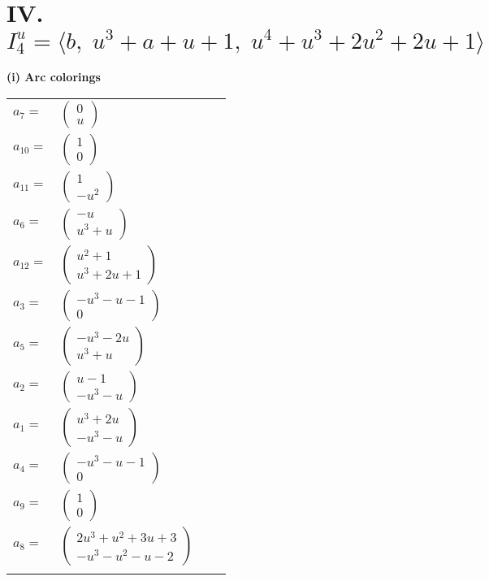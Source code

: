 \documentclass[1p]{elsarticle_modified}
\theoremstyle{definition}
\begin{document}
\centering \section*{IV. $I^u_{4}= \langle b,\;u^3+a+u+1,\;u^4+u^3+2 u^2+2 u+1 \rangle$}
\flushleft \textbf{(i) Arc colorings}\\
\begin{tabular}{m{7pt} m{180pt} m{7pt} m{180pt} }
\flushright $a_{7}=$&$\begin{pmatrix}0\\u\end{pmatrix}$ \\
\flushright $a_{10}=$&$\begin{pmatrix}1\\0\end{pmatrix}$ \\
\flushright $a_{11}=$&$\begin{pmatrix}1\\- u^2\end{pmatrix}$ \\
\flushright $a_{6}=$&$\begin{pmatrix}- u\\u^3+u\end{pmatrix}$ \\
\flushright $a_{12}=$&$\begin{pmatrix}u^2+1\\u^3+2 u+1\end{pmatrix}$ \\
\flushright $a_{3}=$&$\begin{pmatrix}- u^3- u-1\\0\end{pmatrix}$ \\
\flushright $a_{5}=$&$\begin{pmatrix}- u^3-2 u\\u^3+u\end{pmatrix}$ \\
\flushright $a_{2}=$&$\begin{pmatrix}u-1\\- u^3- u\end{pmatrix}$ \\
\flushright $a_{1}=$&$\begin{pmatrix}u^3+2 u\\- u^3- u\end{pmatrix}$ \\
\flushright $a_{4}=$&$\begin{pmatrix}- u^3- u-1\\0\end{pmatrix}$ \\
\flushright $a_{9}=$&$\begin{pmatrix}1\\0\end{pmatrix}$ \\
\flushright $a_{8}=$&$\begin{pmatrix}2 u^3+u^2+3 u+3\\- u^3- u^2- u-2\end{pmatrix}$\\&\end{tabular}
\end{document}
